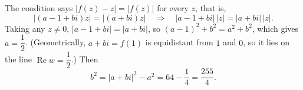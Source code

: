 The condition says $|f(z)-z|=|f(z)|$ for every $z$, that is,
\[|(a-1+bi)z|=|(a+bi)z|\quad\Longrightarrow\quad|a-1+bi|\,|z|=|a+bi|\,|z| .\]
Taking any $z\ne0$, $|a-1+bi|=|a+bi|$, so $(a-1)^2+b^2=a^2+b^2$, which gives $a=\dfrac{1}{2}$. (Geometrically, $a+bi=f(1)$ is equidistant from $1$ and $0$, so it lies on the line $\operatorname{Re}w=\dfrac{1}{2}$.) Then
\[b^2=|a+bi|^2-a^2=64-\dfrac{1}{4}=\boxed{\dfrac{255}{4}}.\]
